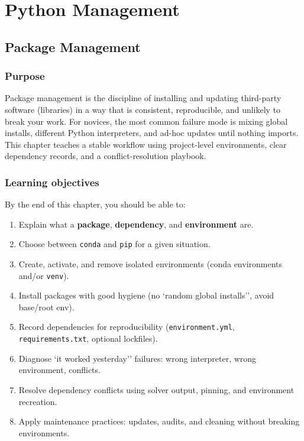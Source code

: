 \part{Python Management}

\chapter{Package Management}
\label{ch:pkg-mgmt}

\section*{Purpose}
Package management is the discipline of installing and updating third-party software (libraries) in a way that is consistent, reproducible, and unlikely to break your work. For novices, the most common failure mode is mixing global installs, different Python interpreters, and ad-hoc updates until nothing imports. This chapter teaches a stable workflow using project-level environments, clear dependency records, and a conflict-resolution playbook.

\section*{Learning objectives}
By the end of this chapter, you should be able to:
\begin{enumerate}
\item Explain what a \textbf{package}, \textbf{dependency}, and \textbf{environment} are.
\item Choose between \texttt{conda} and \texttt{pip} for a given situation.
\item Create, activate, and remove isolated environments (conda environments and/or \texttt{venv}).
\item Install packages with good hygiene (no `random global installs'', avoid base/root env).
  \item Record dependencies for reproducibility (\texttt{environment.yml}, \texttt{requirements.txt}, optional lockfiles).
  \item Diagnose `it worked yesterday'' failures: wrong interpreter, wrong environment, conflicts.
\item Resolve dependency conflicts using solver output, pinning, and environment recreation.
\item Apply maintenance practices: updates, audits, and cleaning without breaking environments.
\end{enumerate}

